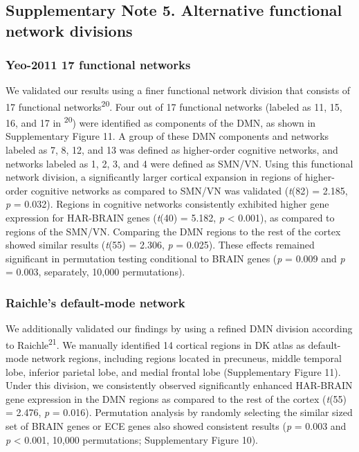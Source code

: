 \begin{refsection}
\subsection*{Supplementary Note 5. Alternative functional network divisions}
\subsubsection*{Yeo-2011 17 functional networks}
We validated our results using a finer functional network division that consists of 17 functional networks\textsuperscript{20}. Four out of 17 functional networks (labeled as 11, 15, 16, and 17 in \textsuperscript{20}) were identified as components of the DMN, as shown in Supplementary Figure 11. A group of these DMN components and networks labeled as 7, 8, 12, and 13 was defined as higher-order cognitive networks, and networks labeled as 1, 2, 3, and 4 were defined as SMN/VN. Using this functional network division, a significantly larger cortical expansion in regions of higher-order cognitive networks as compared to SMN/VN was validated (\textit{t}(82) = 2.185, \textit{p} = 0.032). Regions in cognitive networks consistently exhibited higher gene expression for HAR-BRAIN genes (\textit{t}(40) = 5.182, \textit{p} < 0.001), as compared to regions of the SMN/VN. Comparing the DMN regions to the rest of the cortex showed similar results (\textit{t}(55) = 2.306, \textit{p} = 0.025). These effects remained significant in permutation testing conditional to BRAIN genes (\textit{p} = 0.009 and \textit{p} = 0.003, separately, 10,000 permutations).

\subsubsection*{Raichle’s default-mode network}
We additionally validated our findings by using a refined DMN division according to Raichle\textsuperscript{21}. We manually identified 14 cortical regions in DK atlas as default-mode network regions, including regions located in precuneus, middle temporal lobe, inferior parietal lobe, and medial frontal lobe (Supplementary Figure 11). Under this division, we consistently observed significantly enhanced HAR-BRAIN gene expression in the DMN regions as compared to the rest of the cortex (\textit{t}(55) = 2.476, \textit{p} = 0.016). Permutation analysis by randomly selecting the similar sized set of BRAIN genes or ECE genes also showed consistent results (\textit{p} = 0.003 and \textit{p} < 0.001, 10,000 permutations; Supplementary Figure 10).


\end{refsection}
